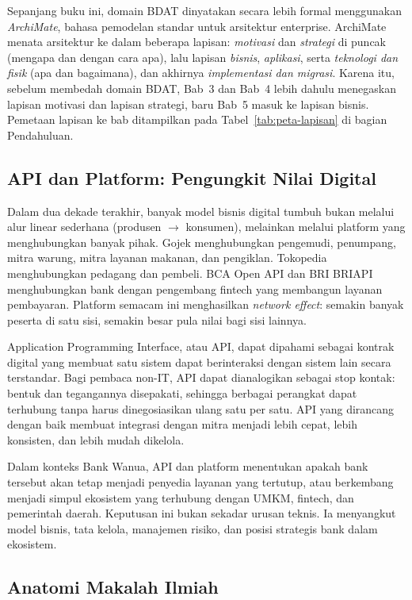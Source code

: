 Sepanjang buku ini, domain BDAT dinyatakan secara lebih formal menggunakan
\emph{ArchiMate}, bahasa pemodelan standar untuk arsitektur enterprise.
ArchiMate menata arsitektur ke dalam beberapa lapisan: \emph{motivasi} dan
\emph{strategi} di puncak (mengapa dan dengan cara apa), lalu lapisan
\emph{bisnis}, \emph{aplikasi}, serta \emph{teknologi dan fisik} (apa dan
bagaimana), dan akhirnya \emph{implementasi dan migrasi}. Karena itu, sebelum
membedah domain BDAT, Bab~3 dan Bab~4 lebih dahulu menegaskan lapisan motivasi
dan lapisan strategi, baru Bab~5 masuk ke lapisan bisnis. Pemetaan lapisan ke
bab ditampilkan pada Tabel~\ref{tab:peta-lapisan} di bagian Pendahuluan.

\subsection{API dan Platform: Pengungkit Nilai Digital}

Dalam dua dekade terakhir, banyak model bisnis digital tumbuh bukan melalui
alur linear sederhana (produsen $\to$ konsumen), melainkan melalui platform
yang menghubungkan banyak pihak. Gojek menghubungkan pengemudi, penumpang,
mitra warung, mitra layanan makanan, dan pengiklan. Tokopedia menghubungkan
pedagang dan pembeli. BCA Open API dan BRI BRIAPI menghubungkan bank dengan
pengembang fintech yang membangun layanan pembayaran. Platform semacam ini
menghasilkan \emph{network effect}: semakin banyak peserta di satu sisi,
semakin besar pula nilai bagi sisi lainnya.

Application Programming Interface, atau API, dapat dipahami sebagai kontrak
digital yang membuat satu sistem dapat berinteraksi dengan sistem lain secara
terstandar. Bagi pembaca non-IT, API dapat dianalogikan sebagai stop kontak:
bentuk dan tegangannya disepakati, sehingga berbagai perangkat dapat terhubung
tanpa harus dinegosiasikan ulang satu per satu. API yang dirancang dengan baik
membuat integrasi dengan mitra menjadi lebih cepat, lebih konsisten, dan lebih
mudah dikelola.

Dalam konteks Bank Wanua, API dan platform menentukan apakah bank tersebut
akan tetap menjadi penyedia layanan yang tertutup, atau berkembang menjadi
simpul ekosistem yang terhubung dengan UMKM, fintech, dan pemerintah daerah.
Keputusan ini bukan sekadar urusan teknis. Ia menyangkut model bisnis, tata
kelola, manajemen risiko, dan posisi strategis bank dalam ekosistem.

\subsection{Anatomi Makalah Ilmiah}

